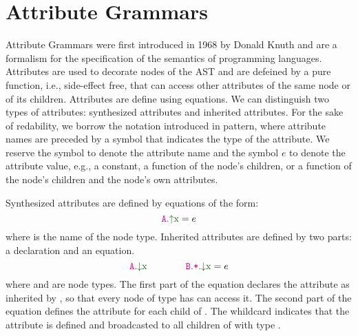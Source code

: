\chapter{Attribute Grammars}
\label{chap:attr-grammars}
Attribute Grammars were first introduced in 1968 by Donald Knuth and are a formalism for the specification
of the semantics of programming languages. Attributes are used to decorate nodes of the AST
and are defeined by a pure function, i.e., side-effect free, that can access other attributes of the same node or of its children.
Attributes are define using equations. We can distinguish two types of attributes: synthesized attributes and inherited attributes.
For the sake of redability, we borrow the notation introduced in pattern, 
where attribute names are preceded by a symbol that indicates the type of the attribute.
We reserve the symbol  to denote the attribute name and the symbol $e$ to denote the attribute value,
e.g., a constant, a function of the node's children, or a function of the node's children 
and the node's own attributes. 

Synthesized attributes are defined by equations of the form:
\begin{equation*}
\Asyn{A}{x} = e
\end{equation*}
where  is the name of the node type.
Inherited attributes are defined by two parts: a declaration and an equation.
\begin{equation*}
\Ainh{A}{x} \quad\quad \quad\quad \Ainhdef{B}{*}{x} = e
\end{equation*}
where  and  are node types. 
The first part of the equation declares the attribute  as inherited by ,
so that every node of type  has can access it. The second part of the 
equation defines the attribute for each child of . The whildcard \astnode{*}
indicates that the attribute is defined and broadcasted to all children of  with type .


